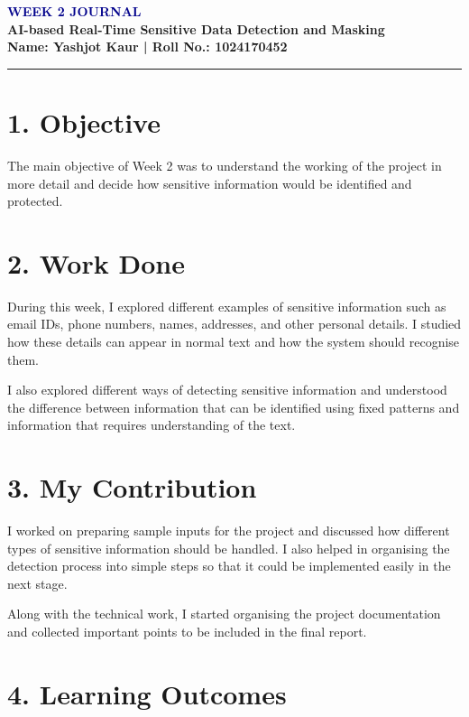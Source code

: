 \documentclass[11pt,a4paper]{article}
\begin{document}
\begin{center}
    {\LARGE \textbf{\textcolor{darkblue}{WEEK 2 JOURNAL}}}\\[5pt]
    {\large \textbf{AI-based Real-Time Sensitive Data Detection and Masking}}\\[6pt]
    \textbf{Name: Yashjot Kaur \quad | \quad Roll No.: 1024170452}
\end{center}

\vspace{4pt}
\hrule
\vspace{8pt}

\section*{1. Objective}

The main objective of Week 2 was to understand the working of the project
in more detail and decide how sensitive information would be identified
and protected.

\section*{2. Work Done}

During this week, I explored different examples of sensitive information
such as email IDs, phone numbers, names, addresses, and other personal
details. I studied how these details can appear in normal text and how the
system should recognise them.

I also explored different ways of detecting sensitive information and
understood the difference between information that can be identified using
fixed patterns and information that requires understanding of the text.

\section*{3. My Contribution}

I worked on preparing sample inputs for the project and discussed how
different types of sensitive information should be handled. I also helped
in organising the detection process into simple steps so that it could be
implemented easily in the next stage.

Along with the technical work, I started organising the project
documentation and collected important points to be included in the final
report.

\section*{4. Learning Outcomes}
\end{document}
